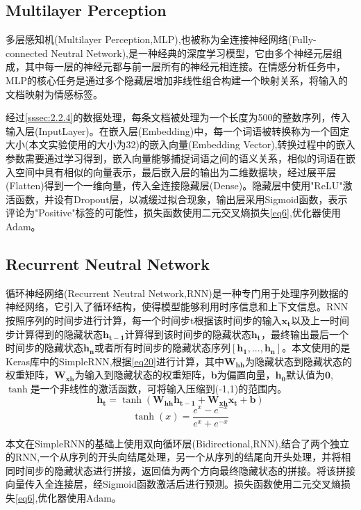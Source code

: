 \documentclass{article}
\begin{document}
\subsection{Multilayer Perception} \label{3.6}
多层感知机(Multilayer Perception,MLP),也被称为全连接神经网络(Fully-connected Neutral Network),是一种经典的深度学习模型，它由多个神经元层组成，其中每一层的神经元都与前一层所有的神经元相连接。在情感分析任务中，MLP的核心任务是通过多个隐藏层增加非线性组合构建一个映射关系，将输入的文档映射为情感标签。

经过\ref{sssec:2.2.4}的数据处理，每条文档被处理为一个长度为500的整数序列，传入输入层(InputLayer)。在嵌入层(Embedding)中，每一个词语被转换称为一个固定大小(本文实验使用的大小为32)的嵌入向量(Embedding Vector),转换过程中的嵌入参数需要通过学习得到，嵌入向量能够捕捉词语之间的语义关系，相似的词语在嵌入空间中具有相似的向量表示，最后嵌入层的输出为二维数据块，经过展平层(Flatten)得到一个一维向量，传入全连接隐藏层(Dense)。隐藏层中使用"ReLU"激活函数，并设有Dropout层，以减缓过拟合现象，输出层采用Sigmoid函数，表示评论为"Positive"标签的可能性，损失函数使用二元交叉熵损失\eqref{eq6},优化器使用Adam。

\subsection{Recurrent Neutral Network}
循环神经网络(Recurrent Neutral Network,RNN)是一种专门用于处理序列数据的神经网络，它引入了循环结构，使得模型能够利用时序信息和上下文信息。RNN按照序列的时间步进行计算，每一个时间步t根据该时间步的输入$\boldsymbol{x_t}$以及上一时间步计算得到的隐藏状态$\boldsymbol{h_{t-1}}$计算得到该时间步的隐藏状态$\boldsymbol{h_t}$，最终输出最后一个时间步的隐藏状态$\boldsymbol{h_n}$或者所有时间步的隐藏状态序列$\boldsymbol{[h_1,...,h_n]}$。本文使用的是Keras库中的SimpleRNN,根据\eqref{eq20}进行计算，其中$\boldsymbol{W_{hh}}$为隐藏状态到隐藏状态的权重矩阵，$\boldsymbol{W_{xh}}$为输入到隐藏状态的权重矩阵，$\boldsymbol{b}$为偏置向量，$\boldsymbol{h_0}$默认值为$\boldsymbol{0}$,$\tanh$是一个非线性的激活函数，可将输入压缩到(-1,1)的范围内。
\begin{equation}
    \boldsymbol{h_t}=\tanh({\boldsymbol{W_{hh}h_{t-1}}}+\boldsymbol{W_{xh}x_t}+\boldsymbol{b}) \label{eq20}
\end{equation}
\begin{equation}
    \tanh(x)=\frac{e^x-e^{-x}}{e^x+e^{-x}} \label{eq21}
\end{equation}

本文在SimpleRNN的基础上使用双向循环层(Bidirectional,RNN),结合了两个独立的RNN,一个从序列的开头向结尾处理，另一个从序列的结尾向开头处理，并将相同时间步的隐藏状态进行拼接，返回值为两个方向最终隐藏状态的拼接。将该拼接向量传入全连接层，经Sigmoid函数激活后进行预测。损失函数使用二元交叉熵损失\eqref{eq6},优化器使用Adam。
\end{document}
